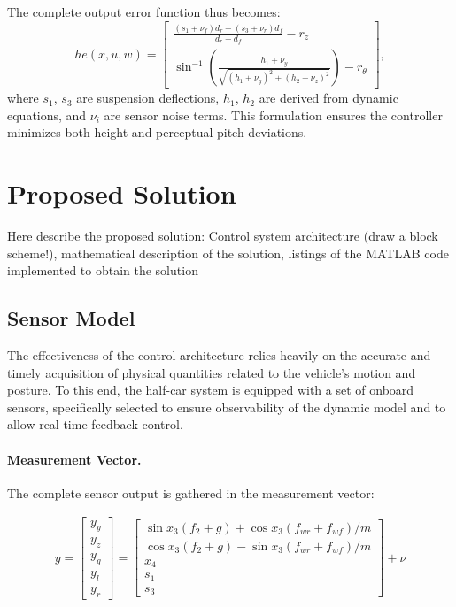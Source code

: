 \documentclass[]{report}
\begin{document}
The complete output error function thus becomes:
\[
he(x, u, w) =
\begin{bmatrix}
	\displaystyle \frac{(s_1 + \nu_f) d_r + (s_3 + \nu_r) d_f}{d_r + d_f} - r_z \\
	\displaystyle \sin^{-1}\left( \frac{h_1 + \nu_y}{\sqrt{(h_1 + \nu_y)^2 + (h_2 + \nu_z)^2}} \right) - r_\theta
\end{bmatrix},
\]
where $s_1$, $s_3$ are suspension deflections, $h_1$, $h_2$ are derived from dynamic equations, and $\nu_i$ are sensor noise terms. This formulation ensures the controller minimizes both height and perceptual pitch deviations.

\section{Proposed Solution}
Here describe the proposed solution: Control system architecture (draw a block scheme!), mathematical description of the solution, listings of the MATLAB code implemented to obtain the solution

\subsection{Sensor Model}

The effectiveness of the control architecture relies heavily on the accurate and timely acquisition of physical quantities related to the vehicle's motion and posture. To this end, the half-car system is equipped with a set of onboard sensors, specifically selected to ensure observability of the dynamic model and to allow real-time feedback control.

\paragraph{Measurement Vector.}
The complete sensor output is gathered in the measurement vector:

\begin{align}
	y = \begin{bmatrix}
		y_y \\ y_z \\ y_g \\ y_l \\ y_r
	\end{bmatrix} =
	\begin{bmatrix}
		\sin x_3(f_2 + g) + \cos x_3(f_{wr} + f_{wf})/m \\
		\cos x_3(f_2 + g) - \sin x_3(f_{wr} + f_{wf})/m \\
		x_4 \\
		s_1 \\
		s_3
	\end{bmatrix} + \nu
\end{align}
\end{document}

